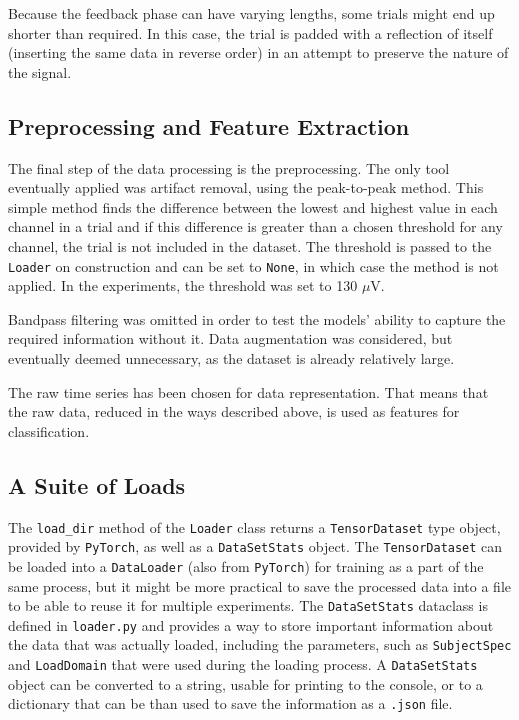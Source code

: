\documentclass[english, he, bc, kiv, iso690alph]{fasthesis}
\begin{document}

Because the feedback phase can have varying lengths, some trials might end up shorter than required. In this case, the trial is padded with a reflection of itself (inserting the same data in reverse order) in an attempt to preserve the nature of the signal.

\subsection{Preprocessing and Feature Extraction}

The final step of the data processing is the preprocessing. The only tool eventually applied was artifact removal, using the peak-to-peak method. This simple method finds the difference between the lowest and highest value in each channel in a trial and if this difference is greater than a chosen threshold for any channel, the trial is not included in the dataset. The threshold is passed to the \texttt{Loader} on construction and can be set to \texttt{None}, in which case the method is not applied. In the experiments, the threshold was set to 130 $\mu$V.

Bandpass filtering was omitted in order to test the models' ability to capture the required information without it. Data augmentation was considered, but eventually deemed unnecessary, as the dataset is already relatively large.

The raw time series has been chosen for data representation. That means that the raw data, reduced in the ways described above, is used as features for classification.

\subsection{A Suite of Loads}

The \texttt{load\_dir} method of the \texttt{Loader} class returns a \texttt{TensorDataset} type object, provided by \texttt{PyTorch}, as well as a \texttt{DataSetStats} object. The \texttt{TensorDataset} can be loaded into a \texttt{DataLoader} (also from \texttt{PyTorch}) for training as a part of the same process, but it might be more practical to save the processed data into a file to be able to reuse it for multiple experiments. The \texttt{DataSetStats} dataclass is defined in \texttt{loader.py} and provides a way to store important information about the data that was actually loaded, including the parameters, such as \texttt{SubjectSpec} and \texttt{LoadDomain} that were used during the loading process. A \texttt{DataSetStats} object can be converted to a string, usable for printing to the console, or to a dictionary that can be than used to save the information as a \texttt{.json} file.
\end{document}
